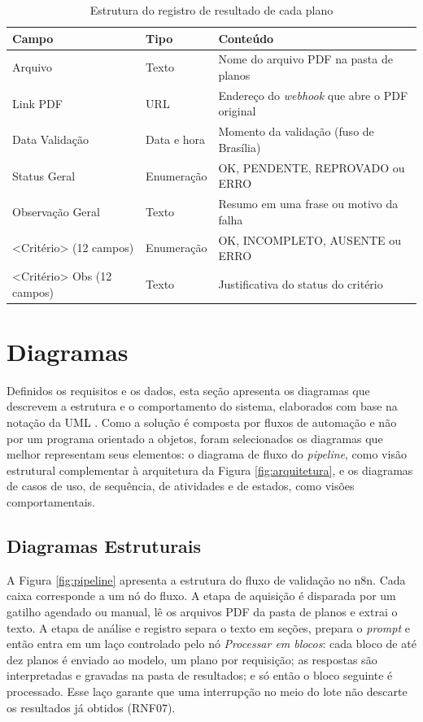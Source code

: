 \begin{table}[H]
\centering
\caption{Estrutura do registro de resultado de cada plano}
\label{tab:colunas}
\footnotesize
\begin{tabular}{@{}L{4.6cm}L{2.0cm}L{7.8cm}@{}}
\toprule
{}
\textbf{Campo} & \textbf{Tipo} & \textbf{Conteúdo} \\ \midrule
Arquivo & Texto & Nome do arquivo PDF na pasta de planos \\
Link PDF & URL & Endereço do \textit{webhook} que abre o PDF original \\
Data Validação & Data e hora & Momento da validação (fuso de Brasília) \\
Status Geral & Enumeração & OK, PENDENTE, REPROVADO ou ERRO \\
Observação Geral & Texto & Resumo em uma frase ou motivo da falha \\
\textless Critério\textgreater{} (12 campos) & Enumeração & OK, INCOMPLETO, AUSENTE ou ERRO \\
\textless Critério\textgreater{} Obs (12 campos) & Texto & Justificativa do status do critério \\ \bottomrule
\end{tabular}
\end{table}

\section{Diagramas}
\label{sec:diagramas}

Definidos os requisitos e os dados, esta seção apresenta os diagramas que descrevem a estrutura e o comportamento do sistema, elaborados com base na notação da UML \cite{OMG2017}. Como a solução é composta por fluxos de automação e não por um programa orientado a objetos, foram selecionados os diagramas que melhor representam seus elementos: o diagrama de fluxo do \textit{pipeline}, como visão estrutural complementar à arquitetura da Figura \ref{fig:arquitetura}, e os diagramas de casos de uso, de sequência, de atividades e de estados, como visões comportamentais.

\subsection{Diagramas Estruturais}

A Figura \ref{fig:pipeline} apresenta a estrutura do fluxo de validação no n8n. Cada caixa corresponde a um nó do fluxo. A etapa de aquisição é disparada por um gatilho agendado ou manual, lê os arquivos PDF da pasta de planos e extrai o texto. A etapa de análise e registro separa o texto em seções, prepara o \textit{prompt} e então entra em um laço controlado pelo nó \textit{Processar em blocos}: cada bloco de até dez planos é enviado ao modelo, um plano por requisição; as respostas são interpretadas e gravadas na pasta de resultados; e só então o bloco seguinte é processado. Esse laço garante que uma interrupção no meio do lote não descarte os resultados já obtidos (RNF07).


